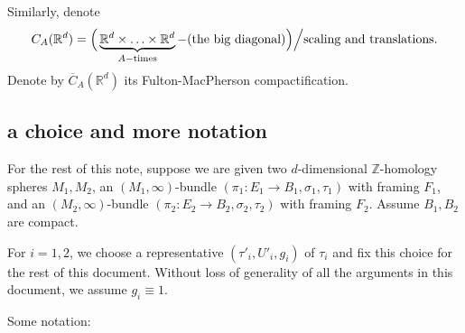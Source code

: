\documentclass[11pt]{article}
\theoremstyle{definition}
\newtheorem{dfn}[thm]{Definition}
\theoremstyle{remark}
\def\ov#1{\overline{#1}}
\def\Z{\mathbb{Z}}
\def\R{\mathbb{R}}
\def\D{\mathbb{D}}
\def\tn#1{\textnormal{#1}}
\begin{document}
Similarly, denote 
$$C_A(\R^d)=\Big(\underbrace{\R^d\times\ldots\times\R^d}_{A-\tn{times}}-(\tn{the big diagonal})\Big)\Big/\tn{scaling and translations}.$$
Denote by $\ov{C}_A(\R^d)$ its Fulton-MacPherson compactification. 

%




\subsection{a choice and more notation}
\label{notation11_sec}

For the rest of this note, suppose we are given two $d$-dimensional $\Z$-homology spheres $M_1,M_2$, an $(M_1,\infty)$-bundle $(\pi_1:E_1\to B_1,\sigma_1,\tau_1)$ with framing $F_1$, and an $(M_2,\infty)$-bundle $(\pi_2:E_2\to B_2,\sigma_2,\tau_2)$ with framing $F_2$. 
Assume $B_1,B_2$ are compact. 

For $i=1,2$, we choose a representative $(\tau'_i,U'_i,g_i)$ of $\tau_i$ and fix this choice for the rest of this document. 
Without loss of generality of all the arguments in this document, we assume $g_i\equiv1$. 

Some notation: 
\end{document}
